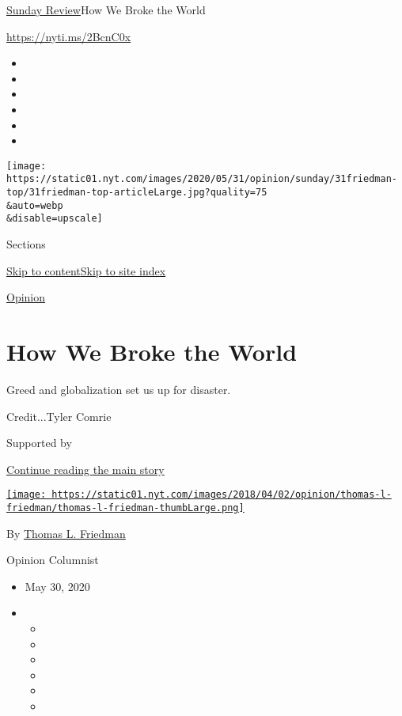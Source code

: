 \href{/section/opinion/sunday}{Sunday Review}\textbar{}How We Broke the
World

\href{https://nyti.ms/2BcnC0x}{https://nyti.ms/2BcnC0x}

\begin{itemize}
\item
\item
\item
\item
\item
\item
\end{itemize}

\texttt{[image: https://static01.nyt.com/images/2020/05/31/opinion/sunday/31friedman-top/31friedman-top-articleLarge.jpg?quality=75\\\&auto=webp\\\&disable=upscale]}

Sections

\protect\hyperlink{site-content}{Skip to
content}\protect\hyperlink{site-index}{Skip to site index}

\href{/section/opinion}{Opinion}

\hypertarget{how-we-broke-the-world}{%
\section{How We Broke the World}\label{how-we-broke-the-world}}

Greed and globalization set us up for disaster.

Credit...Tyler Comrie

Supported by

\protect\hyperlink{after-sponsor}{Continue reading the main story}

\href{https://www.nytimes.com/by/thomas-l-friedman}{\texttt{[image: https://static01.nyt.com/images/2018/04/02/opinion/thomas-l-friedman/thomas-l-friedman-thumbLarge.png]}}

By \href{https://www.nytimes.com/by/thomas-l-friedman}{Thomas L.
Friedman}

Opinion Columnist

\begin{itemize}
\item
  May 30, 2020
\item
  \begin{itemize}
  \item
  \item
  \item
  \item
  \item
  \item
  \end{itemize}
\end{itemize}

